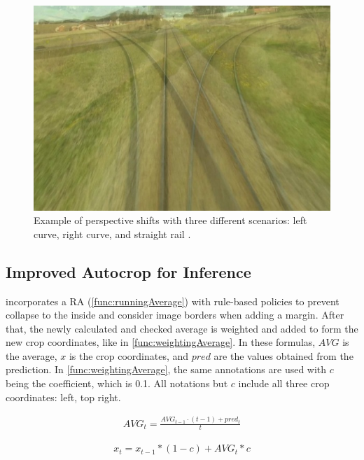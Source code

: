 \begin{figure}[H]
    \centering
    \includegraphics[width=0.7\linewidth]{PICs/Baselinepaper/perspective_shifts.jpg}
    \caption{Example of perspective shifts with three different scenarios: left curve, right curve, and straight rail \cite{tepNet2024}.}
    \label{fig:perspective_shifts}
\end{figure}

\subsection{Improved Autocrop for Inference}
\label{sec:imporvedAutocrop}

\cite{tepNet2024} incorporates a \ac{RA} (\autoref{func:runningAverage}) with rule-based policies to prevent collapse to the inside and consider image borders when adding a margin. After that, the newly calculated and checked average is weighted and added to form the new crop coordinates, like in \autoref{func:weightingAverage}. In these formulas, $AVG$ is the average, $x$ is the crop coordinates, and $pred$ are the values obtained from the prediction. In \autoref{func:weightingAverage}, the same annotations are used with $c$ being the coefficient, which is 0.1. All notations but $c$ include all three crop coordinates: left, top right.

\begin{align}
    AVG_t = \frac{AVG_{t-1} \cdot (t-1) + pred_t}{t}
    \label{func:runningAverage}
\end{align}

\begin{align}
    x_{t} = x_{t-1} * (1 - c) + AVG_{t} * c
    \label{func:weightingAverage}
\end{align}

